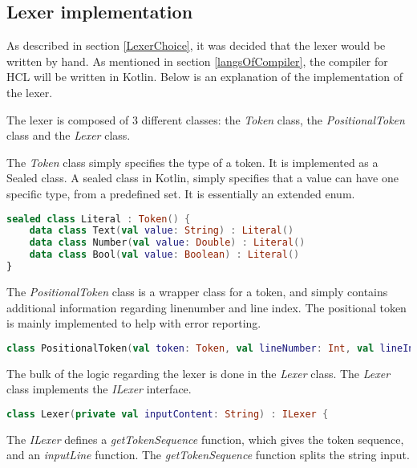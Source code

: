 \subsection{Lexer implementation}
As described in section \ref{LexerChoice}, it was decided that the lexer would be written by hand.
As mentioned in section \ref{langsOfCompiler}, the compiler for HCL will be written in Kotlin.
Below is an explanation of the implementation of the lexer.

The lexer is composed of 3 different classes: the \textit{Token} class, the \textit{PositionalToken} class and the \textit{Lexer} class.

The \textit{Token} class simply specifies the type of a token. 
It is implemented as a Sealed class. 
A sealed class in Kotlin, simply specifies that a value can have one specific type, from a predefined set\cite{KotlinSealed}.
It is essentially an extended enum.
\begin{lstlisting}[language=Kotlin,label=lis:tokenClass,caption=A snippet from the token class .,firstnumber=9]
sealed class Literal : Token() {
	data class Text(val value: String) : Literal()
	data class Number(val value: Double) : Literal()
	data class Bool(val value: Boolean) : Literal()
}
\end{lstlisting}

The \textit{PositionalToken} class is a wrapper class for a token, and simply contains additional information regarding linenumber and line index.
The positional token is mainly implemented to help with error reporting.
\begin{lstlisting}[language=Kotlin,label=lis:PositionalTokenClass,caption=A snippet from the token class .,firstnumber=10]
class PositionalToken(val token: Token, val lineNumber: Int, val lineIndex: Int)
\end{lstlisting}

The bulk of the logic regarding the lexer is done in the \textit{Lexer} class.
The \textit{Lexer} class implements the \textit{ILexer} interface.

\begin{lstlisting}[language=Kotlin,label=lis:Lexer,caption=The Lexer .,firstnumber=8]
class Lexer(private val inputContent: String) : ILexer {
\end{lstlisting}

The \textit{ILexer} defines a \textit{getTokenSequence} function, which gives the token sequence, and an \textit{inputLine} function.
The \textit{getTokenSequence} function splits the string input.

